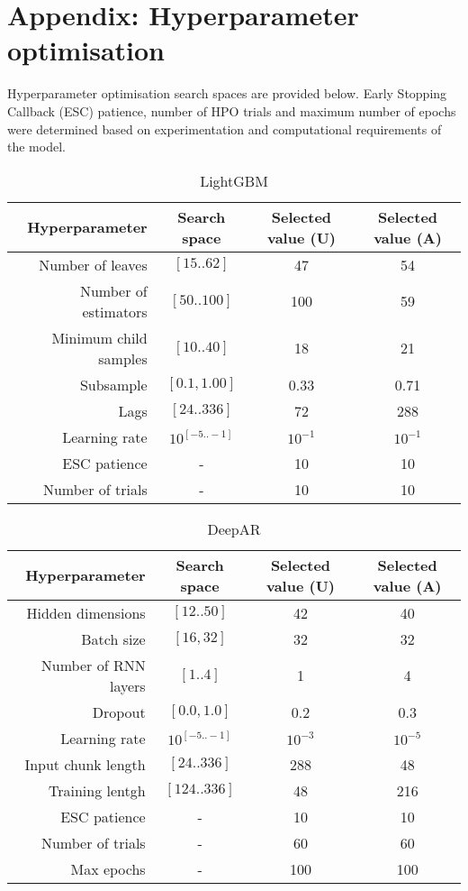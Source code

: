 \section{Appendix: Hyperparameter optimisation}\label{appendix_a}

\setcounter{table}{0}
\renewcommand{\thetable}{A\arabic{table}}
\setcounter{figure}{0}
\renewcommand{\thefigure}{A\arabic{figure}}

Hyperparameter optimisation search spaces are provided below. Early Stopping Callback (ESC) patience, number of HPO trials and maximum number of epochs were determined based on experimentation and computational requirements of the model.

\begin{table}[H]
\centering
\caption{LightGBM}
\begin{tabular}{|r|c|c|c|}
    \hline
    Hyperparameter & Search space & Selected value (U) & Selected value (A)\\
    \hline
    Number of leaves & $[15..62]$ & 47 & 54 \\
    Number of estimators & $[50..100]$ & 100 & 59 \\
    Minimum child samples & $[10..40]$ & 18 & 21 \\
    Subsample & $[0.1,1.00]$ & 0.33 & 0.71 \\
    Lags & $[24..336]$ & 72 & 288 \\
    Learning rate & $10^{[-5..-1]}$ & $10^{-1}$ & $10^{-1}$ \\
    ESC patience & - & 10 & 10 \\
    Number of trials & - & 10 & 10 \\
    \hline
\end{tabular}
\end{table}

\begin{table}[H]
\centering
\caption{DeepAR}
\begin{tabular}{|r|c|c|c|}
    \hline
    Hyperparameter & Search space & Selected value (U) & Selected value (A)\\
    \hline
    Hidden dimensions & $[12..50]$ & 42 & 40 \\
    Batch size & $[16, 32]$ & 32 & 32\\
    Number of RNN layers & $[1..4]$ & 1 & 4\\
    Dropout & $[0.0,1.0]$ & 0.2 & 0.3\\
    Learning rate & $10^{[-5..-1]}$ & $10^{-3}$ & $10^{-5}$\\
    Input chunk length & $[24..336]$ & 288 & 48\\
    Training lentgh & $[124..336]$ & 48 & 216\\
    ESC patience & - & 10 & 10 \\
    Number of trials & - & 60 & 60 \\
    Max epochs & - & 100 & 100 \\
    \hline
\end{tabular}
\end{table}


